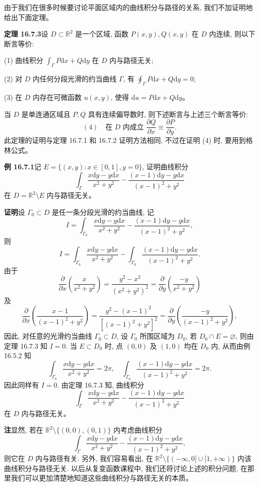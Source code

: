 \documentclass[UTF8, 12pt, fontset=fandol, oneside]{ctexart}
\begin{document}
由于我们在很多时候要讨论平面区域内的曲线积分与路径的关系, 我们不加证明地给出下面定理。

\noindent\textbf{定理 16.7.3}\quad 设 $D\subset\mathbb R^2$ 是一个区域, 函数 $P(x,y),Q(x,y)$ 在 $D$ 内连续, 则以下断言等价:

(1) 曲线积分 $\int_\Gamma P\mathrm dx+Q\mathrm dy$ 在 $D$ 内与路径无关;

(2) 对 $D$ 内任何分段光滑的约当曲线 $\Gamma$, 有 $\oint_\Gamma P\mathrm dx+Q\mathrm dy=0$;

(3) 在 $D$ 内存在可微函数 $u(x,y)$, 使得 $\mathrm du=P\mathrm dx+Q\mathrm dy$。

当 $D$ 是单连通区域且 $P,Q$ 具有连续偏导数时, 则下述断言与上述三个断言等价:
\[
  (4)\quad \text{在 }D\text{ 内成立 }\frac{\partial Q}{\partial x}\equiv\frac{\partial P}{\partial y}.
\]
此定理的证明与定理 16.7.1 和 16.7.2 证明方法相同, 不过在证明 (4) 时, 要用到格林公式。

\noindent\textbf{例 16.7.1}\quad 记 $E=\{(x,y):x\in[0,1],y=0\}$, 证明曲线积分
\[
  \int_\Gamma\frac{x\mathrm dy-y\mathrm dx}{x^2+y^2}
  -\frac{(x-1)\mathrm dy-y\mathrm dx}{(x-1)^2+y^2}
\]
在 $D=\mathbb R^2\setminus E$ 内与路径无关。

\noindent\textbf{证明}\quad 设 $\Gamma_0\subset D$ 是任一条分段光滑的约当曲线, 记
\[
  I=\int_{\Gamma_0}\frac{x\mathrm dy-y\mathrm dx}{x^2+y^2}
  -\frac{(x-1)\mathrm dy-y\mathrm dx}{(x-1)^2+y^2},
\]
则
\[
  I=\int_{\Gamma_0}\frac{x\mathrm dy-y\mathrm dx}{x^2+y^2}
  -\int_{\Gamma_0}\frac{(x-1)\mathrm dy-y\mathrm dx}{(x-1)^2+y^2}.
\]
由于
\[
  \frac{\partial}{\partial x}\left(\frac{x}{x^2+y^2}\right)
  =\frac{y^2-x^2}{(x^2+y^2)^2}
  =\frac{\partial}{\partial y}\left(\frac{-y}{x^2+y^2}\right)
\]
及
\[
  \frac{\partial}{\partial x}\left(\frac{x-1}{(x-1)^2+y^2}\right)
  =\frac{y^2-(x-1)^2}{[(x-1)^2+y^2]^2}
  =\frac{\partial}{\partial y}\left(\frac{-y}{(x-1)^2+y^2}\right),
\]
因此, 对任意的光滑约当曲线 $\Gamma_0\subset D$, 设 $\Gamma_0$ 所围区域为 $D_0$, 若 $D_0\cap E=\varnothing$, 则由定理 16.7.3 知 $I=0$. 当 $E\subset D_0$ 时, 点 $(0,0)$ 及 $(1,0)$ 均在 $D_0$ 内, 从而由例 16.5.2 知
\[
  \int_{\Gamma_0}\frac{x\mathrm dy-y\mathrm dx}{x^2+y^2}=2\pi,
  \quad
  \int_{\Gamma_0}\frac{(x-1)\mathrm dy-y\mathrm dx}{(x-1)^2+y^2}=2\pi.
\]
因此同样有 $I=0$. 由定理 16.7.3 知, 曲线积分
\[
  \int_\Gamma\frac{x\mathrm dy-y\mathrm dx}{x^2+y^2}
  -\frac{(x-1)\mathrm dy-y\mathrm dx}{(x-1)^2+y^2}
\]
在 $D$ 内与路径无关。

\noindent\textbf{注}\quad 显然, 若在 $\mathbb R^2\setminus\{(0,0),(0,1)\}$ 内考虑曲线积分
\[
  \int_\Gamma\frac{x\mathrm dy-y\mathrm dx}{x^2+y^2}
  -\frac{(x-1)\mathrm dy-y\mathrm dx}{(x-1)^2+y^2},
\]
则它在 $D$ 内与路径有关. 另外, 我们容易看出, 在 $\mathbb R^2\setminus\{(-\infty,0]\cup[1,+\infty)\}$ 内该曲线积分与路径无关. 以后从复变函数课程中, 我们还将讨论上述的积分问题, 在那里我们可以更加清楚地知道这些曲线积分与路径无关的本质。
\end{document}
